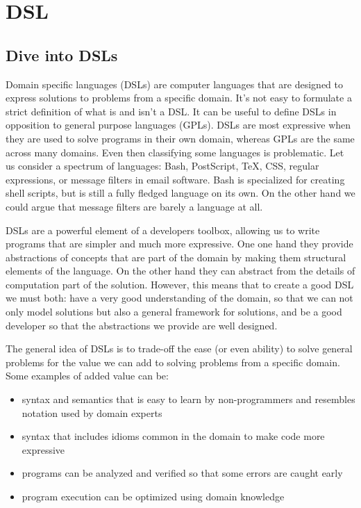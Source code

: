 \chapter{DSL}

\section{Dive into DSLs}

Domain specific languages (DSLs) are computer languages that are designed to express solutions to problems from a specific domain. It's not easy to formulate a strict definition of what is and isn't a DSL. It can be useful to define DSLs in opposition to general purpose languages (GPLs). DSLs are most expressive when they are used to solve programs in their own domain, whereas GPLs are the same across many domains. Even then classifying some languages is problematic. Let us consider a spectrum of languages: Bash, PostScript, TeX, CSS, regular expressions, or message filters in email software. Bash is specialized for creating shell scripts, but is still a fully fledged language on its own. On the other hand we could argue that message filters are barely a language at all.

DSLs are a powerful element of a developers toolbox, allowing us to write programs that are simpler and much more expressive. One one hand they provide abstractions of concepts that are part of the domain by making them structural elements of the language. On the other hand they can abstract from the details of computation part of the solution. However, this means that to create a good DSL we must both: have a very good understanding of the domain, so that we can not only model solutions but also a general framework for solutions, and be a good developer so that the abstractions we provide are well designed.

The general idea of DSLs is to trade-off the ease (or even ability) to solve general problems for the value we can add to solving problems from a specific domain. Some examples of added value can be:
\begin{itemize}
	\item syntax and semantics that is easy to learn by non-programmers and resembles notation used by domain experts
	\item syntax that includes idioms common in the domain to make code more expressive
	\item programs can be analyzed and verified so that some errors are caught early
	\item program execution can be optimized using domain knowledge
\end{itemize}

